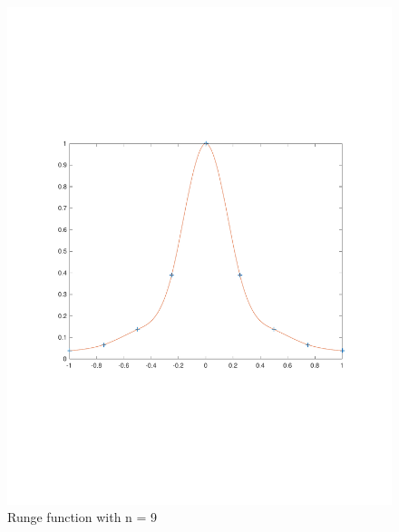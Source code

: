 \documentclass{article}
\begin{document}
\begin{figure}[h]
\centering
\caption{Runge function with n = 9}
\includegraphics[scale=0.6]{runge_n=9}
\end{figure}
\end{document}
